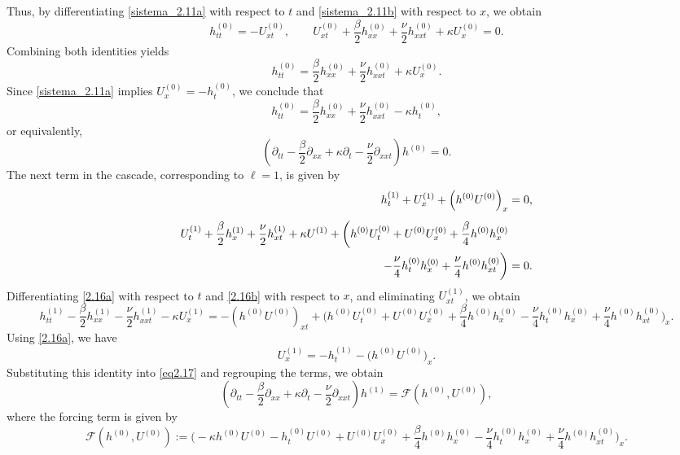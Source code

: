 \documentclass[reqno]{amsart}
\theoremstyle{definition}
\numberwithin{equation}{section}
\numberwithin{theorem}{section}
\numberwithin{definition}{section}
\begin{document}
Thus, by differentiating \eqref{sistema_2.11a} with respect to $t$ and \eqref{sistema_2.11b} with respect to $x$, we obtain
\[
h^{(0)}_{tt} = -U^{(0)}_{xt}, \qquad
U^{(0)}_{xt} + \frac{\beta}{2} h^{(0)}_{xx}+\frac{\nu}{2}h^{(0)}_{xxt} + \kappa U^{(0)}_{x}=0.
\]
Combining both identities yields
\begin{equation}
	h^{(0)}_{tt} =  \frac{\beta}{2}  h^{(0)}_{xx}+\frac{\nu}{2}h^{(0)}_{xxt} + \kappa U^{(0)}_x.
\end{equation}
Since \eqref{sistema_2.11a} implies $U_x^{(0)}=-h_t^{(0)}$, we conclude that
\begin{equation}
	h^{(0)}_{tt} =  \frac{\beta}{2}  h^{(0)}_{xx}+\frac{\nu}{2}h^{(0)}_{xxt} - \kappa h^{(0)}_t,
\end{equation}
or equivalently,
\begin{equation}\label{eq2.15}
	\left(\partial_{tt} - \frac{\beta}{2}\partial_{xx} + \kappa\partial_t-\frac{\nu}{2}\partial_{xxt}\right)h^{(0)}=0.
\end{equation}
The next term in the cascade, corresponding to $\ell=1$, is given by
\begin{subequations}\label{sistema_2.16}
	\begin{align}
		h^{(1)}_t + U^{(1)}_x + \left(h^{(0)}U^{(0)}\right)_x
		&= 0,\label{2.16a}\\[0.15cm]
		U_t^{(1)}+  \frac{\beta}{2} h_x^{(1)}+\frac{\nu}{2} h_{xt}^{(1)}+\kappa U^{(1)}
		+\bigg( h^{(0)} U_t^{(0)}+ U^{(0)}U_x^{(0)}+\frac{\beta}{4}  h^{(0)}h_x^{(0)}
		&\nonumber\\
		\hspace{3.2cm}
		-\frac{\nu}{4}h_t^{(0)}h_x^{(0)}+\frac{\nu}{4}h^{(0)}h_{xt}^{(0)}\bigg)
		&=0.\label{2.16b}
	\end{align}
\end{subequations}
Differentiating \eqref{2.16a} with respect to $t$ and \eqref{2.16b} with respect to $x$, and eliminating $U^{(1)}_{xt}$, we obtain
\begin{equation}\label{eq2.17}
	h^{(1)}_{tt}-\frac{\beta}{2}h^{(1)}_{xx}-\frac{\nu}{2}h^{(1)}_{xxt}-\kappa U^{(1)}_{x}
	=-\left(h^{(0)}U^{(0)}\right)_{xt}
	+\bigg(h^{(0)} U_t^{(0)}+ U^{(0)}U_x^{(0)}
	+\frac{\beta}{4}  h^{(0)}h_x^{(0)}
	-\frac{\nu}{4}h_t^{(0)}h_x^{(0)}+\frac{\nu}{4}h^{(0)}h_{xt}^{(0)}\bigg)_{x}.
\end{equation}
Using \eqref{2.16a}, we have
\[
U^{(1)}_x=-h^{(1)}_t-\big(h^{(0)}U^{(0)}\big)_x.
\]
Substituting this identity into \eqref{eq2.17} and regrouping the terms, we obtain
\begin{equation}\label{eq:LF}
	\left(\partial_{tt} - \frac{\beta}{2}\partial_{xx} + \kappa\partial_t-\frac{\nu}{2}\partial_{xxt}\right)h^{(1)}
	=\mathcal{F}(h^{(0)}, U^{(0)}),
\end{equation}
where the forcing term is given by
\begin{equation}\label{funcionF}
	\mathcal{F}(h^{(0)}, U^{(0)}):=\bigg(-\kappa h^{(0)}U^{(0)}-h_{t}^{(0)}U^{(0)}+U^{(0)}U_x^{(0)}
	+\frac{\beta}{4}  h^{(0)}h_x^{(0)}
	-\frac{\nu}{4}h_t^{(0)}h_x^{(0)}+\frac{\nu}{4}h^{(0)}h_{xt}^{(0)}\bigg)_{x}.
\end{equation}
\end{document}
